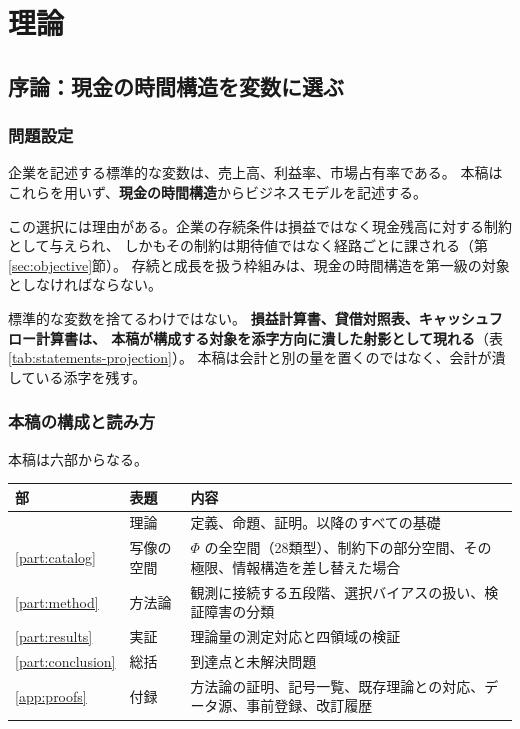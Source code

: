 \part{理論}\label{part:theory}

\chapter{序論：現金の時間構造を変数に選ぶ}

\section{問題設定}

企業を記述する標準的な変数は、売上高、利益率、市場占有率である。
本稿はこれらを用いず、\textbf{現金の時間構造}からビジネスモデルを記述する。

この選択には理由がある。企業の存続条件は損益ではなく現金残高に対する制約として与えられ、
しかもその制約は期待値ではなく経路ごとに課される（第\ref{sec:objective}節）。
存続と成長を扱う枠組みは、現金の時間構造を第一級の対象としなければならない。

標準的な変数を捨てるわけではない。
\textbf{損益計算書、貸借対照表、キャッシュフロー計算書は、
本稿が構成する対象を添字方向に潰した射影として現れる}（表\ref{tab:statements-projection}）。
本稿は会計と別の量を置くのではなく、会計が潰している添字を残す。

\section{本稿の構成と読み方}

本稿は六部からなる。

\begin{center}
\begin{tabularx}{\textwidth}{@{}llX@{}}
\toprule
部 & 表題 & 内容 \\
\midrule
\ref{part:theory} & 理論 & 定義、命題、証明。以降のすべての基礎 \\
\ref{part:catalog} & 写像の空間 & $\Phi$ の全空間（28類型）、制約下の部分空間、その極限、情報構造を差し替えた場合 \\
\ref{part:method} & 方法論 & 観測に接続する五段階、選択バイアスの扱い、検証障害の分類 \\
\ref{part:results} & 実証 & 理論量の測定対応と四領域の検証 \\
\ref{part:conclusion} & 総括 & 到達点と未解決問題 \\
\ref{app:proofs} & 付録 & 方法論の証明、記号一覧、既存理論との対応、データ源、事前登録、改訂履歴 \\
\bottomrule
\end{tabularx}
\label{tab:part-structure}
\end{center}

